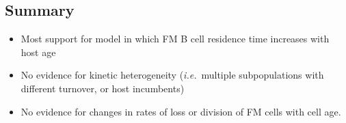 \documentclass[11pt]{article}
\newcommand{\ie}{\textit{i.e.}}
\newcommand{\khi}{Ki67$^\text{hi}$}
\newcommand{\klo}{Ki67$^\text{lo}$}
\begin{document}
	\subsection*{Summary}
	\begin{itemize}
		\item Most support for model in which FM B cell residence time increases with host age
		\item No evidence for kinetic heterogeneity (\ie\ multiple subpopulations with different turnover, or host incumbents) 
		\item No evidence for changes in rates of loss or division of FM cells with cell age.
	\end{itemize}
	
	
\end{document}
